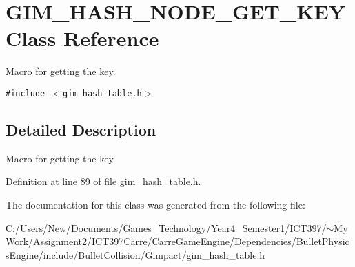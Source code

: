 \hypertarget{class_g_i_m___h_a_s_h___n_o_d_e___g_e_t___k_e_y}{
\section{GIM\_\-HASH\_\-NODE\_\-GET\_\-KEY Class Reference}
\label{class_g_i_m___h_a_s_h___n_o_d_e___g_e_t___k_e_y}
}
Macro for getting the key.  


{\tt \#include $<$gim\_\-hash\_\-table.h$>$}



\subsection{Detailed Description}
Macro for getting the key. 

Definition at line 89 of file gim\_\-hash\_\-table.h.

The documentation for this class was generated from the following file:\begin{CompactItemize}
\item 
C:/Users/New/Documents/Games\_\-Technology/Year4\_\-Semester1/ICT397/$\sim$My Work/Assignment2/ICT397Carre/CarreGameEngine/Dependencies/BulletPhysicsEngine/include/BulletCollision/Gimpact/gim\_\-hash\_\-table.h\end{CompactItemize}
